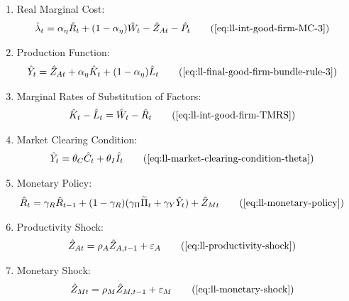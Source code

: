 \documentclass[
	12pt,
	]{article}
\numberwithin{equation}{section}
\theoremstyle{definition}
\theoremstyle{plain}
\theoremstyle{plain}
\theoremstyle{plain}
\begin{document}
{\begin{itemize}
\begin{enumerate}
			\item Real Marginal Cost:
			\begin{align}
				\hat{\lambda}_t &= {\alpha_\eta} \hat{R}_t + (1- {\alpha_\eta}) \hat{W}_t - \hat{Z}_{At} - \hat{P}_t \tag{\ref{eq:ll-int-good-firm-MC-3}}
			\end{align}
			
			\item Production Function:
			\begin{align}
				\hat{Y}_t &= \hat{Z}_{At} + {\alpha_\eta} \hat{K}_t + (1-{\alpha_\eta}) \hat{L}_t \tag{\ref{eq:ll-final-good-firm-bundle-rule-3}}
			\end{align}
			
			
			\item Marginal Rates of Substitution of Factors:
			\begin{align}
				\hat{K}_t - \hat{L}_t &= \hat{W}_t - \hat{R}_t \tag{\ref{eq:ll-int-good-firm-TMRS}}
			\end{align}
			
			\item Market Clearing Condition:
			\begin{align}
				\hat{Y}_t &= \theta_C \hat{C}_t + \theta_I \hat{I}_t 
				\tag{\ref{eq:ll-market-clearing-condition-theta}}
			\end{align}
			
			\item Monetary Policy:
			\begin{align}
				& \hat{R}_t = \gamma_R \hat{R}_{t-1} + (1-\gamma_R)(\gamma_\Pi \widetilde{\Pi}_t + \gamma_Y \hat{Y}_t) + \hat{Z}_{Mt} \tag{\ref{eq:ll-monetary-policy}}
			\end{align}
			
			\item Productivity Shock:
			\begin{align}
				\hat{Z}_{At} &= \rho_A \hat{Z}_{A,t-1} + \varepsilon_{A} \tag{\ref{eq:ll-productivity-shock}}
			\end{align}
			
			\item Monetary Shock:
			\begin{align}
				\hat{Z}_{Mt} &= \rho_M \hat{Z}_{M,t-1} + \varepsilon_{M} \tag{\ref{eq:ll-monetary-shock}}
			\end{align}
			
		\end{enumerate}
		
	\end{itemize}
	
} %
\end{document}
